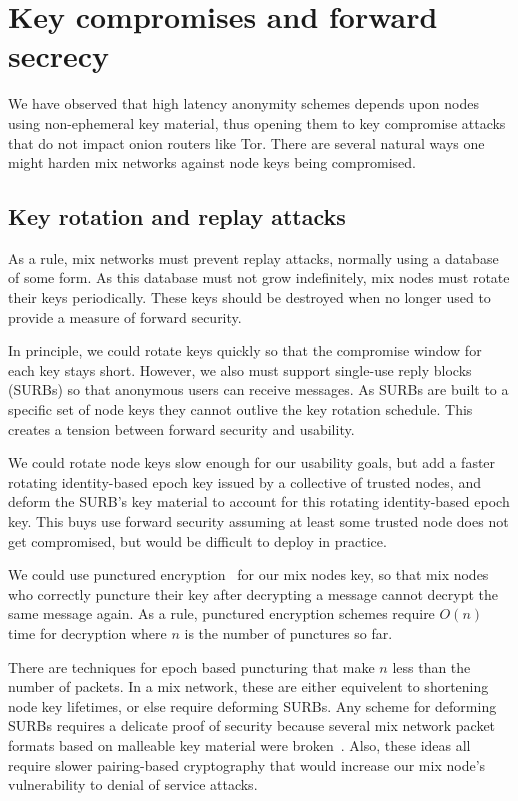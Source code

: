 
\section{Key compromises and forward secrecy}\label{sec:forward-sec}

We have observed that high latency anonymity schemes depends upon
nodes using non-ephemeral key material, thus opening them to key
compromise attacks that do not impact onion routers like Tor.
There are several natural ways one might harden mix networks against
node keys being compromised. 


\subsection{Key rotation and replay attacks}

As a rule, mix networks must prevent replay attacks, normally using
a database of some form.  As this database must not grow indefinitely,
mix nodes must rotate their keys periodically.  These keys should be
destroyed when no longer used to provide a measure of forward security.

In principle, we could rotate keys quickly so that the compromise
window for each key stays short.  However, we also must
support single-use reply blocks (SURBs) so that anonymous users can
receive messages.  As SURBs are built to a specific set of node
keys they cannot outlive the key rotation schedule.  This creates
a tension between forward security and usability.

We could rotate node keys slow enough for our usability goals, but add
a faster rotating identity-based epoch key issued by a collective of
trusted nodes, and deform the SURB's key material to account for this
rotating identity-based epoch key.
This buys use forward security
assuming at least some trusted node does not get compromised, but
would be difficult to deploy in practice. 

We could use punctured encryption~\cite{libforwardsec} for our
mix nodes key, so that mix nodes who correctly puncture their key
after decrypting a message cannot decrypt the same message again. 
As a rule, punctured encryption schemes require $O(n)$ time for
decryption where $n$ is the number of punctures so far.  

There are techniques for epoch based puncturing that make $n$ less
than the number of packets.  In a mix network, these are either
equivelent to shortening node key lifetimes, or else require
deforming SURBs.  Any scheme for deforming SURBs requires a delicate
proof of security because several mix network packet formats based
on malleable key material were broken~\cite{Danezis2006}. 
Also, these ideas all require slower pairing-based cryptography that
would increase our mix node's vulnerability to denial of service attacks. 


